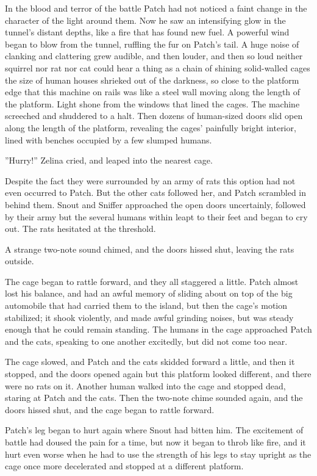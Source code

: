 \documentclass[12pt]{book}
\begin{document}
 In the blood and terror of the battle Patch had not noticed a faint change in the character of the light around them. Now he saw an intensifying glow in the tunnel's distant depths, like a fire that has found new fuel. A powerful wind began to blow from the tunnel, ruffling the fur on Patch's tail. A huge noise of clanking and clattering grew audible, and then louder, and then so loud neither squirrel nor rat nor cat could hear a thing as a chain of shining solid-walled cages the size of human houses shrieked out of the darkness, so close to the platform edge that this machine on rails was like a steel wall moving along the length of the platform. Light shone from the windows that lined the cages. The machine screeched and shuddered to a halt. Then dozens of human-sized doors slid open along the length of the platform, revealing the cages' painfully bright interior, lined with benches occupied by a few slumped humans.\par
 ''Hurry!'' Zelina cried, and leaped into the nearest cage.\par
 Despite the fact they were surrounded by an army of rats this option had not even occurred to Patch. But the other cats followed her, and Patch scrambled in behind them. Snout and Sniffer approached the open doors uncertainly, followed by their army %
 but the several humans within leapt to their feet and began to cry out. The rats hesitated at the threshold.\par
A strange two-note sound chimed, and the doors hissed shut, leaving the rats outside.\par
 The cage began to rattle forward, and they all staggered a little. Patch almost lost his balance, and had an awful memory of sliding about on top of the big automobile that had carried them to the island, but then the cage's motion stabilized; it shook violently, and made awful grinding noises, but was steady enough that he could remain standing. The humans in the cage approached Patch and the cats, speaking to one another excitedly, but did not come too near.\par
The cage slowed, and Patch and the cats skidded forward a little, and then it stopped, and the doors opened again %
 but this platform looked different, and there were no rats on it. Another human walked into the cage and stopped dead, staring at Patch and the cats. Then the two-note chime sounded again, and the doors hissed shut, and the cage began to rattle forward.\par
 Patch's leg began to hurt again where Snout had bitten him. The excitement of battle had doused the pain for a time, but now it began to throb like fire, and it hurt even worse when he had to use the strength of his legs to stay upright as the cage once more decelerated and stopped at a different platform.\par
\end{document}
